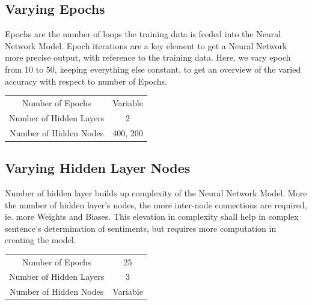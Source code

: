 \subsection{Varying Epochs}
Epochs are the number of loops the training data is feeded into the Neural Network Model. Epoch iterations are a key element to get a Neural Network more precise output, with reference to the training data. Here, we vary epoch from 10 to 50, keeping everything else constant, to get an overview of the varied accuracy with respect to number of Epochs.

\begin{center}
\begin{tabular}{| c | c |}
\hline
Number of Epochs & Variable\\
Number of Hidden Layers & 2\\
Number of Hidden Nodes & 400, 200\\
\hline
\end{tabular}
\end{center}

\begin{center}
\end{center}

\subsection{Varying Hidden Layer Nodes}
Number of hidden layer builds up complexity of the Neural Network Model. More the number of hidden layer's nodes, the more inter-node connections are required, ie. more Weights and Biases. This elevation in complexity shall help in complex sentence's determination of sentiments, but requires more computation in creating the model.

\begin{center}
\begin{tabular}{| c | c |}
\hline
Number of Epochs & 25\\
Number of Hidden Layers & 3\\
Number of Hidden Nodes & Variable\\
\hline
\end{tabular}
\end{center}

